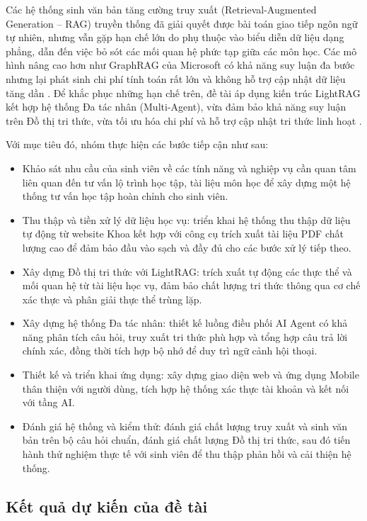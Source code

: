 \begin{refsection}
Các hệ thống sinh văn bản tăng cường truy xuất (Retrieval-Augmented Generation -- RAG) truyền thống đã giải quyết được bài toán giao tiếp ngôn ngữ tự nhiên, nhưng vẫn gặp hạn chế lớn do phụ thuộc vào biểu diễn dữ liệu dạng phẳng, dẫn đến việc bỏ sót các mối quan hệ phức tạp giữa các môn học. Các mô hình nâng cao hơn như GraphRAG của Microsoft có khả năng suy luận đa bước nhưng lại phát sinh chi phí tính toán rất lớn và không hỗ trợ cập nhật dữ liệu tăng dần \cite{graphrag2024}. Để khắc phục những hạn chế trên, đề tài áp dụng kiến trúc LightRAG kết hợp hệ thống Đa tác nhân (Multi-Agent), vừa đảm bảo khả năng suy luận trên Đồ thị tri thức, vừa tối ưu hóa chi phí và hỗ trợ cập nhật tri thức linh hoạt \cite{lightrag2024}.

Với mục tiêu đó, nhóm thực hiện các bước tiếp cận như sau:
\begin{itemize}[label={--}, leftmargin=1.5em]
    \item Khảo sát nhu cầu của sinh viên về các tính năng và nghiệp vụ cần quan tâm liên quan đến tư vấn lộ trình học tập, tài liệu môn học để xây dựng một hệ thống tư vấn học tập hoàn chỉnh cho sinh viên.
    \item Thu thập và tiền xử lý dữ liệu học vụ: triển khai hệ thống thu thập dữ liệu tự động từ website Khoa kết hợp với công cụ trích xuất tài liệu PDF chất lượng cao để đảm bảo đầu vào sạch và đầy đủ cho các bước xử lý tiếp theo.
    \item Xây dựng Đồ thị tri thức với LightRAG: trích xuất tự động các thực thể và mối quan hệ từ tài liệu học vụ, đảm bảo chất lượng tri thức thông qua cơ chế xác thực và phân giải thực thể trùng lặp.
    \item Xây dựng hệ thống Đa tác nhân: thiết kế luồng điều phối AI Agent có khả năng phân tích câu hỏi, truy xuất tri thức phù hợp và tổng hợp câu trả lời chính xác, đồng thời tích hợp bộ nhớ để duy trì ngữ cảnh hội thoại.
    \item Thiết kế và triển khai ứng dụng: xây dựng giao diện web và ứng dụng Mobile thân thiện với người dùng, tích hợp hệ thống xác thực tài khoản và kết nối với tầng AI.
    \item Đánh giá hệ thống và kiểm thử: đánh giá chất lượng truy xuất và sinh văn bản trên bộ câu hỏi chuẩn, đánh giá chất lượng Đồ thị tri thức, sau đó tiến hành thử nghiệm thực tế với sinh viên để thu thập phản hồi và cải thiện hệ thống.
\end{itemize}

\subsection*{\thepropsubsec\quad Kết quả dự kiến của đề tài}


\end{refsection}
